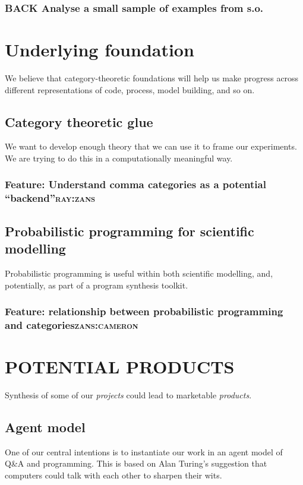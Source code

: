 \documentclass[11pt]{article}
\begin{document}
\subsubsection{{\bfseries\sffamily BACK} Analyse a small sample of examples from s.o.}
\label{sec:org837b656}
\section{Underlying foundation}
\label{sec:org4087849}
We believe that category-theoretic foundations will help us make
progress across different representations of code, process, model
building, and so on.

\subsection{Category theoretic glue}
\label{sec:org9a0a0a4}
We want to develop enough theory that we can use it to frame our
experiments.  We are trying to do this in a computationally meaningful way.

\subsubsection{Feature: Understand comma categories as a potential “backend”\hfill{}\textsc{ray:zans}}
\label{sec:orgd24ee16}

\subsection{Probabilistic programming for scientific modelling}
\label{sec:org1258d88}
Probabilistic programming is useful within both scientific modelling,
and, potentially, as part of a program synthesis toolkit.

\subsubsection{Feature: relationship between probabilistic programming and categories\hfill{}\textsc{zans:cameron}}
\label{sec:orgad5babe}
\section{POTENTIAL PRODUCTS}
\label{sec:org01ad531}
Synthesis of some of our \emph{projects} could lead to marketable \emph{products}.

\subsection{Agent model}
\label{sec:org7b22d6d}
One of our central intentions is to instantiate our work in an agent
model of Q\&A and programming.  This is based on Alan Turing’s
suggestion that computers could talk with each other to sharpen their
wits.
\end{document}
